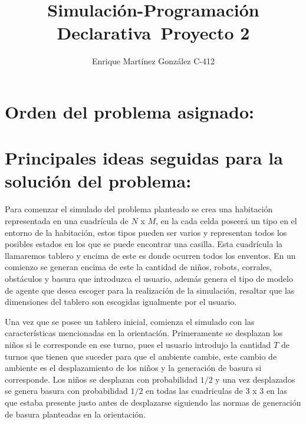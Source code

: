 \documentclass[titlepage,11pt]{scrartcl}
\title{	
    \normalfont\normalsize
	\vspace{25pt}
	{\huge Simulación-Programación Declarativa\ Proyecto 2}
	\vspace{12pt}
}
\author{\LARGE Enrique Martínez González C-412}
\date{}
\begin{document}
\maketitle

\section{Orden del problema asignado:}

\section{Principales ideas seguidas para la solución del problema:}
Para comenzar el simulado del problema planteado se crea una habitación representada en una cuadrícula de $N$ x $M$, en la cada celda poseerá un tipo en el entorno de la habitación, estos tipos pueden ser varios y representan todos los posibles estados en los que se puede encontrar una casilla. Esta cuadrícula la llamaremos tablero y encima de este es donde ocurren todos los enventos. En un comienzo se generan encima de este la cantidad de niños, robots, corrales, obstáculos y basura que introduzca el usuario, además genera el tipo de modelo de agente que desea escoger para la realización de la simulación, resaltar que las dimensiones del tablero son escogidas igualmente por el usuario.

Una vez que se posee un tablero inicial, comienza el simulado con las características mencionadas en la orientación. Primeramente se desplazan los niños si le corresponde en ese turno, pues el usuario introdujo la cantidad $T$ de turnos que tienen que suceder para que el ambiente cambie, este cambio de ambiente es el desplazamiento de los niños y la generación de basura si corresponde. Los niños se desplazan con probabilidad $1/2$ y una vez desplazados se genera basura con probabilidad $1/2$ en todas las cuadriculas de $3$ x $3$ en las que estaba presente justo antes de desplazarse siguiendo las normas de generación de basura planteadas en la orientación.
\end{document}

